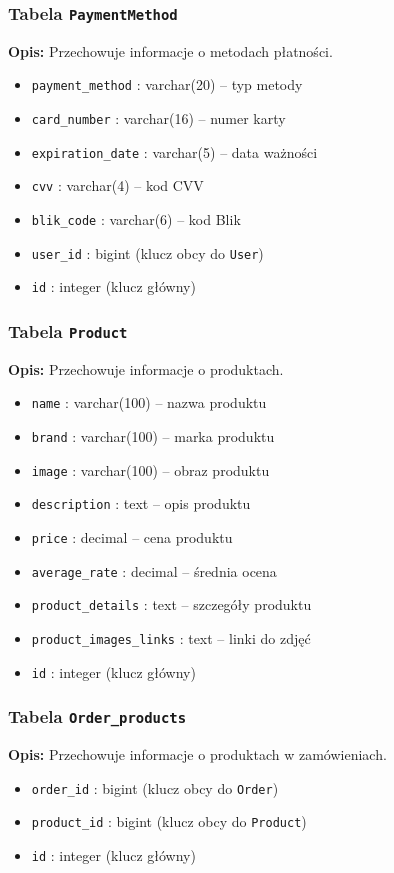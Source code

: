 \documentclass[12pt,a4paper,oneside]{article}
\theoremstyle{definition}
\numberwithin{equation}{section}
\begin{document}
\subsubsection*{Tabela \texttt{PaymentMethod}}
\textbf{Opis:} Przechowuje informacje o metodach płatności.
\begin{itemize}
    \item \texttt{payment\string_method} : varchar(20) – typ metody
    \item \texttt{card\string_number} : varchar(16) – numer karty
    \item \texttt{expiration\string_date} : varchar(5) – data ważności
    \item \texttt{cvv} : varchar(4) – kod CVV
    \item \texttt{blik\string_code} : varchar(6) – kod Blik
    \item \texttt{user\string_id} : bigint (klucz obcy do \texttt{User})
    \item \texttt{id} : integer (klucz główny)
\end{itemize}

\subsubsection*{Tabela \texttt{Product}}
\textbf{Opis:} Przechowuje informacje o produktach.
\begin{itemize}
    \item \texttt{name} : varchar(100) – nazwa produktu
    \item \texttt{brand} : varchar(100) – marka produktu
    \item \texttt{image} : varchar(100) – obraz produktu
    \item \texttt{description} : text – opis produktu
    \item \texttt{price} : decimal – cena produktu
    \item \texttt{average\string_rate} : decimal – średnia ocena
    \item \texttt{product\string_details} : text – szczegóły produktu
    \item \texttt{product\string_images\string_links} : text – linki do zdjęć
    \item \texttt{id} : integer (klucz główny)
\end{itemize}

\subsubsection*{Tabela \texttt{Order\string_products}}
\textbf{Opis:} Przechowuje informacje o produktach w zamówieniach.
\begin{itemize}
    \item \texttt{order\string_id} : bigint (klucz obcy do \texttt{Order})
    \item \texttt{product\string_id} : bigint (klucz obcy do \texttt{Product})
    \item \texttt{id} : integer (klucz główny)
\end{itemize}
\end{document}
